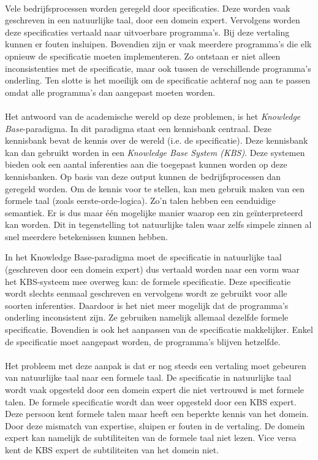 \paragraph{} Vele bedrijfsprocessen worden geregeld door specificaties. Deze worden vaak geschreven in een natuurlijke taal, door een domein expert. Vervolgens worden deze specificaties vertaald naar uitvoerbare programma's. Bij deze vertaling kunnen er fouten insluipen. Bovendien zijn er vaak meerdere programma's die elk opnieuw de specificatie moeten implementeren. Zo ontstaan er niet alleen inconsistenties met de specificatie, maar ook tussen de verschillende programma's onderling. Ten slotte is het moeilijk om de specificatie achteraf nog aan te passen omdat alle programma's dan aangepast moeten worden.

\paragraph{} Het antwoord van de academische wereld op deze problemen, is het \textit{Knowledge Base}-paradigma. In dit paradigma staat een kennisbank centraal. Deze kennisbank bevat de kennis over de wereld (i.e. de specificatie). Deze kennisbank kan dan gebruikt worden in een \textit{Knowledge Base System (KBS)}. Deze systemen bieden ook een aantal inferenties aan die toegepast kunnen worden op deze kennisbanken. Op basis van deze output kunnen de bedrijfsprocessen dan geregeld worden. Om de kennis voor te stellen, kan men gebruik maken van een formele taal (zoals eerste-orde-logica). Zo'n talen hebben een eenduidige semantiek. Er is dus maar één mogelijke manier waarop een zin geïnterpreteerd kan worden. Dit in tegenstelling tot natuurlijke talen waar zelfs simpele zinnen al snel meerdere betekenissen kunnen hebben.

In het Knowledge Base-paradigma moet de specificatie in natuurlijke taal (geschreven door een domein expert) dus vertaald worden naar een vorm waar het KBS-systeem mee overweg kan: de formele specificatie. Deze specificatie wordt slechts eenmaal geschreven en vervolgens wordt ze gebruikt voor alle soorten inferenties. Daardoor is het niet meer mogelijk dat de programma's onderling inconsistent zijn. Ze gebruiken namelijk allemaal dezelfde formele specificatie. Bovendien is ook het aanpassen van de specificatie makkelijker. Enkel de specificatie moet aangepast worden, de programma's blijven hetzelfde.

\paragraph{} Het probleem met deze aanpak is dat er nog steeds een vertaling moet gebeuren van natuurlijke taal naar een formele taal. De specificatie in natuurlijke taal wordt vaak opgesteld door een domein expert die niet vertrouwd is met formele talen. De formele specificatie wordt dan weer opgesteld door een KBS expert. Deze persoon kent formele talen maar heeft een beperkte kennis van het domein. Door deze mismatch van expertise, sluipen er fouten in de vertaling. De domein expert kan namelijk de subtiliteiten van de formele taal niet lezen. Vice versa kent de KBS expert de subtiliteiten van het domein niet.

